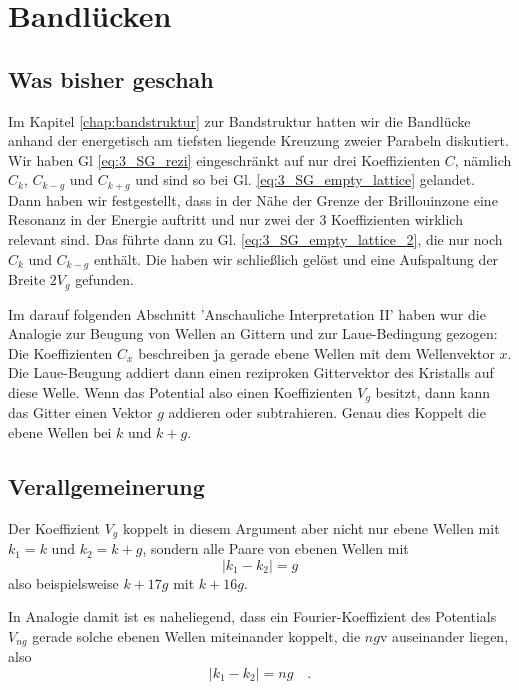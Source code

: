
\renewcommand{\lastmod}{11. Juni 2023}
\renewcommand{\chapterauthors}{Markus Lippitz}


\chapter{Bandlücken}


\section*{Was bisher geschah}


Im Kapitel \ref{chap:bandstruktur} zur Bandstruktur hatten wir die Bandlücke anhand der energetisch am tiefsten liegende Kreuzung zweier Parabeln diskutiert. Wir haben Gl \ref{eq:3_SG_rezi} eingeschränkt auf nur drei Koeffizienten $C$, nämlich $C_k$,  $C_{k - g}$ und  $C_{k + g}$ und sind so bei Gl.  \ref{eq:3_SG_empty_lattice}  gelandet. Dann haben wir festgestellt, dass in der Nähe der Grenze der Brillouinzone eine Resonanz in der Energie auftritt und nur zwei der 3 Koeffizienten wirklich relevant sind. Das führte dann zu Gl. \ref{eq:3_SG_empty_lattice_2}, die nur noch $C_k$ und  $C_{k - g}$ enthält. Die haben wir schließlich gelöst und eine Aufspaltung der Breite $2 V_g$ gefunden.

Im darauf folgenden Abschnitt 'Anschauliche Interpretation II' haben wur die Analogie zur Beugung von Wellen an Gittern und zur Laue-Bedingung  gezogen: Die Koeffizienten $C_x$ beschreiben ja gerade ebene Wellen mit dem Wellenvektor $x$. Die Laue-Beugung addiert dann einen reziproken Gittervektor des Kristalls auf diese Welle. Wenn das Potential also einen Koeffizienten $V_g$ besitzt, dann kann das Gitter einen Vektor $g$ addieren oder subtrahieren. Genau dies Koppelt die ebene Wellen bei $k$ und $k+g$. 

\section*{Verallgemeinerung}

Der Koeffizient $V_g$ koppelt in diesem Argument aber nicht nur ebene Wellen mit $k_1 = k$ und $k_2 =k+g$, sondern alle Paare von ebenen Wellen mit 
\begin{equation}
    | k_1 - k_2 | = g
\end{equation}
also beispielsweise $k+17g$ mit $k+16g$.

In Analogie damit ist es naheliegend, dass ein Fourier-Koeffizient des Potentials $V_{n g}$ gerade solche ebenen Wellen miteinander  koppelt, die $n g$v auseinander liegen, also 
\begin{equation}
    | k_1 - k_2 | = n g \quad . \label{eq:anhang_bandluecke_n}
\end{equation}

